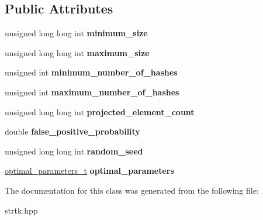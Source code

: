 \subsection*{Public Attributes}
\begin{DoxyCompactItemize}
\item 
\hypertarget{classstrtk_1_1bloom_1_1parameters_a262807e5a6860957ce855e66f42d4dac}{unsigned long long int {\bfseries minimum\-\_\-size}}\label{classstrtk_1_1bloom_1_1parameters_a262807e5a6860957ce855e66f42d4dac}

\item 
\hypertarget{classstrtk_1_1bloom_1_1parameters_a2a38ac9675e0d143172ed79acc388a08}{unsigned long long int {\bfseries maximum\-\_\-size}}\label{classstrtk_1_1bloom_1_1parameters_a2a38ac9675e0d143172ed79acc388a08}

\item 
\hypertarget{classstrtk_1_1bloom_1_1parameters_a55b2f070fbb00c248ddeede1ce17aec7}{unsigned int {\bfseries minimum\-\_\-number\-\_\-of\-\_\-hashes}}\label{classstrtk_1_1bloom_1_1parameters_a55b2f070fbb00c248ddeede1ce17aec7}

\item 
\hypertarget{classstrtk_1_1bloom_1_1parameters_a1da499c323f86823378a47364f4edaf7}{unsigned int {\bfseries maximum\-\_\-number\-\_\-of\-\_\-hashes}}\label{classstrtk_1_1bloom_1_1parameters_a1da499c323f86823378a47364f4edaf7}

\item 
\hypertarget{classstrtk_1_1bloom_1_1parameters_ab64de09806e1f2655dad875e75aeef5f}{unsigned long long int {\bfseries projected\-\_\-element\-\_\-count}}\label{classstrtk_1_1bloom_1_1parameters_ab64de09806e1f2655dad875e75aeef5f}

\item 
\hypertarget{classstrtk_1_1bloom_1_1parameters_a86679bd51d774f9d52b60098c4922120}{double {\bfseries false\-\_\-positive\-\_\-probability}}\label{classstrtk_1_1bloom_1_1parameters_a86679bd51d774f9d52b60098c4922120}

\item 
\hypertarget{classstrtk_1_1bloom_1_1parameters_a1230bb767861b076c57042f17f94631c}{unsigned long long int {\bfseries random\-\_\-seed}}\label{classstrtk_1_1bloom_1_1parameters_a1230bb767861b076c57042f17f94631c}

\item 
\hypertarget{classstrtk_1_1bloom_1_1parameters_a6362ce41a912c689a3a5af08666000c8}{\hyperlink{structstrtk_1_1bloom_1_1parameters_1_1optimal__parameters__t}{optimal\-\_\-parameters\-\_\-t} {\bfseries optimal\-\_\-parameters}}\label{classstrtk_1_1bloom_1_1parameters_a6362ce41a912c689a3a5af08666000c8}

\end{DoxyCompactItemize}


The documentation for this class was generated from the following file\-:\begin{DoxyCompactItemize}
\item 
strtk.\-hpp\end{DoxyCompactItemize}
